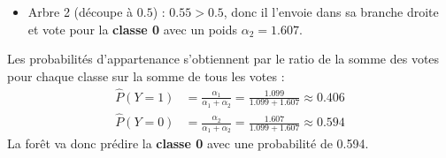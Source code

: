 \documentclass[solutions]{../exercices}
\begin{document}
\begin{solution}
\begin{enumerate}
\begin{itemize}
        \item Arbre 2 (découpe à $0.5$) : $0.55 > 0.5$, donc il l'envoie dans sa branche droite et vote pour la \textbf{classe 0} avec un poids $\alpha_2 = 1.607$.
    \end{itemize}
    Les probabilités d'appartenance s'obtiennent par le ratio de la somme des votes pour chaque classe sur la somme de tous les votes :
    \begin{align*}
        \hat{P}(Y=1) &= \frac{\alpha_1}{\alpha_1 + \alpha_2} = \frac{1.099}{1.099 + 1.607} \approx 0.406 \\
        \hat{P}(Y=0) &= \frac{\alpha_2}{\alpha_1 + \alpha_2} = \frac{1.607}{1.099 + 1.607} \approx 0.594
    \end{align*}
    La forêt va donc prédire la \textbf{classe 0} avec une probabilité de 0.594.
\end{enumerate}
\end{solution}
\end{document}
